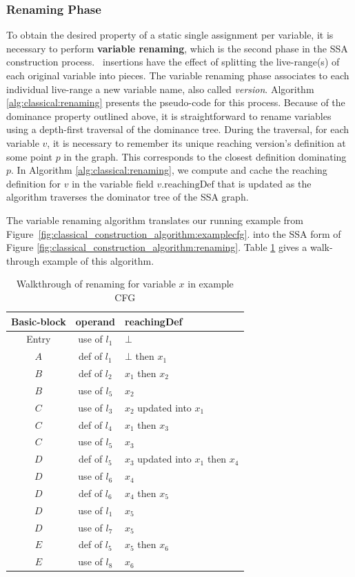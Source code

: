 \subsubsection*{Renaming Phase}
\newcommand\reachingDef[1]{#1.\mathrm{reachingDef}}
To obtain the desired property of a static single assignment per variable,
it is necessary to perform \textbf{variable renaming}, which
is the second phase in the SSA construction process.
\phiop\ insertions have the effect of splitting the live-range(s) of each original variable into pieces. The variable renaming phase associates to each individual live-range a new variable name, also called \emph{version}.
Algorithm \ref{alg:classical:renaming} presents the pseudo-code
for this process.
Because of the dominance property outlined above,
it is straightforward to rename variables
using a depth-first traversal of the dominance tree.
During the traversal, for each variable $v$, it is necessary to
remember its unique reaching version's definition at some point $p$ in the graph. This corresponds to the closest definition dominating $p$.
In Algorithm \ref{alg:classical:renaming}, we compute and cache the 
reaching definition for $v$ in the variable field $\reachingDef{v}$ that is updated as the algorithm traverses the dominator tree of the SSA graph.

The variable renaming algorithm translates our running example 
from Figure~\ref{fig:classical_construction_algorithm:examplecfg}.
into the SSA form of Figure
\ref{fig:classical_construction_algorithm:renaming}.
Table \ref{table:classical_construction_algorithm:renaming} 
gives a walk-through example of this algorithm.

\begin{table}
\begin{tabular}{c|c|l}
Basic-block & operand &  reachingDef\\ \hline
Entry & use of $l_1$ & $\bot$\\
$A$ & def of $l_1$ &  $\bot$ then $x_1$\\
$B$ & def of $l_2$ &  $x_1$ then $x_2$\\
$B$ & use of $l_5$ & $x_2$\\
$C$ & use of $l_3$ & $x_2$ updated into $x_1$\\
$C$ & def of $l_4$ &  $x_1$ then $x_3$\\
$C$ & use of $l_5$ & $x_3$\\
$D$ & def of $l_5$ & $x_3$ updated into $x_1$ then $x_4$\\
$D$ & use of $l_6$ & $x_4$\\
$D$ & def of $l_6$ & $x_4$ then $x_5$\\
$D$ & use of $l_1$ & $x_5$\\
$D$ & use of $l_7$ & $x_5$\\
$E$ & def of $l_5$ & $x_5$ then $x_6$\\
$E$ & use of $l_8$ & $x_6$
\end{tabular}
\caption{\label{table:classical_construction_algorithm:renaming}Walkthrough of renaming for variable $x$ in example CFG}
\end{table}


